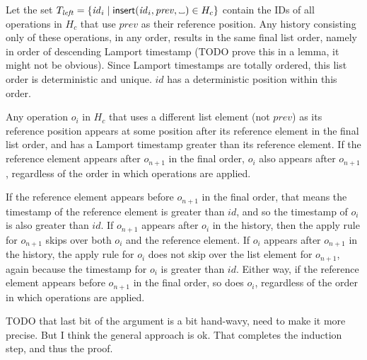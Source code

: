 \documentclass[a4paper,twocolumn,10pt]{article}
\newcommand{\placeholder}{%
  \makebox[0.7em]{%
    \kern.07em
    \vrule height.3ex
    \hrulefill
    \vrule height.3ex
    \kern.07em
  }%
}
\begin{document}
Let the set $T_\mathit{left} = \{\mathit{id}_i \mid \mathsf{insert}(\mathit{id}_i, \mathit{prev}, \placeholder) \in H_c\}$ contain the IDs of all operations in $H_c$ that use $\mathit{prev}$ as their reference position. Any history consisting only of these operations, in any order, results in the same final list order, namely in order of descending Lamport timestamp (TODO prove this in a lemma, it might not be obvious). Since Lamport timestamps are totally ordered, this list order is deterministic and unique. $\mathit{id}$ has a deterministic position within this order.

Any operation $o_i$ in $H_c$ that uses a different list element (not $\mathit{prev}$) as its reference position appears at some position after its reference element in the final list order, and has a Lamport timestamp greater than its reference element. If the reference element appears after $o_{n+1}$ in the final order, $o_i$ also appears after $o_{n+1}$, regardless of the order in which operations are applied.

If the reference element appears before $o_{n+1}$ in the final order, that means the timestamp of the reference element is greater than $\mathit{id}$, and so the timestamp of $o_i$ is also greater than $\mathit{id}$. If $o_{n+1}$ appears after $o_i$ in the history, then the apply rule for $o_{n+1}$ skips over both $o_i$ and the reference element. If $o_i$ appears after $o_{n+1}$ in the history, the apply rule for $o_i$ does not skip over the list element for $o_{n+1}$, again because the timestamp for $o_i$ is greater than $\mathit{id}$. Either way, if the reference element appears before $o_{n+1}$ in the final order, so does $o_i$, regardless of the order in which operations are applied.

TODO that last bit of the argument is a bit hand-wavy, need to make it more precise. But I think the general approach is ok. That completes the induction step, and thus the proof.

{\footnotesize

{}}
\end{document}
